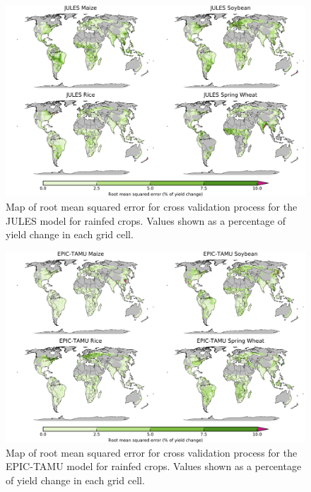 \documentclass[12pt]{article}
\begin{document}
\begin{figure}[!htb]
  \centering
  \includegraphics[width=15.5cm]{JULES_spatial_MSE_ton_ha.png}
  \caption{Map of root mean squared error for cross validation process for the JULES model for rainfed crops. Values shown as a percentage of yield change in each grid cell.}
\end{figure}

\begin{figure}[!htb]
  \centering
  \includegraphics[width=15.5cm]{EPIC-TAMU_spatial_MSE_ton_ha.png}
  \caption{Map of root mean squared error for cross validation process for the EPIC-TAMU model for rainfed crops. Values shown as a percentage of yield change in each grid cell.}
\end{figure}
\end{document}
